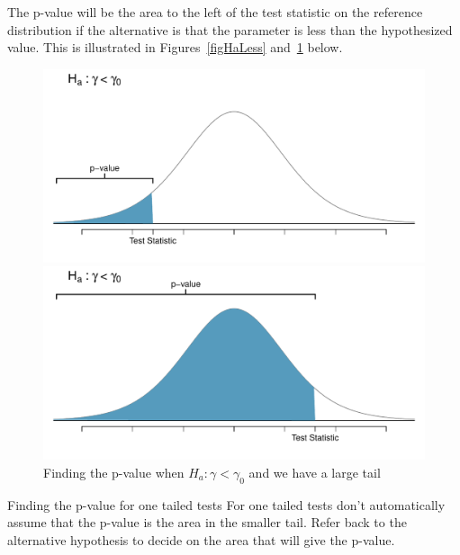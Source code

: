 The p-value will be the area to the left of the test statistic
on the reference distribution if the alternative is that the parameter is less than the hypothesized value.
This is illustrated in Figures~\ref{figHaLess} and~\ref{figHaLessLargeTail} below.


\begin{figure}[H]
\begin{minipage}[b]{0.5\linewidth}
\centering
\includegraphics[width=\textwidth]{05-5/figures/pvalAlternateLessThan/pvalAlternateLessThanSmallTail.pdf}
\captionsetup{width=0.9\textwidth}
\caption{Finding the p-value when $H_a : \gamma < \gamma_0$ }
\label{figHaLess}
\end{minipage}
\quad
\begin{minipage}[b]{0.5\linewidth}
\centering
\includegraphics[width=\textwidth]{05-5/figures/pvalAlternateLessThan/pvalAlternateLessThanLargeTail.pdf}
\captionsetup{width=0.9\textwidth}
\caption{Finding the p-value when $H_a : \gamma < \gamma_0$  and we have a large tail}
\label{figHaLessLargeTail}
\end{minipage}
\end{figure}

\begin{caution}
{Finding the p-value for one tailed tests}
{For one tailed tests don't automatically assume that the p-value is the area in the smaller tail.
Refer back to the alternative hypothesis to decide on the area that will give the p-value.}
\end{caution}


